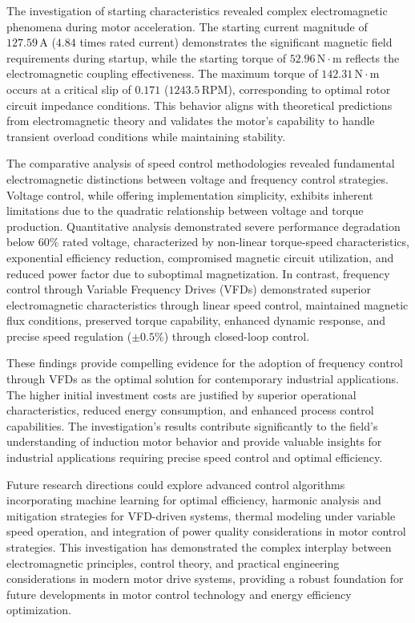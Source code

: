 \documentclass[a4paper,12pt]{IEEEtran}
\begin{document}
The investigation of starting characteristics revealed complex electromagnetic phenomena during motor acceleration. The starting current magnitude of $127.59\,\text{A}$ ($4.84$ times rated current) demonstrates the significant magnetic field requirements during startup, while the starting torque of $52.96\,\text{N}\cdot\text{m}$ reflects the electromagnetic coupling effectiveness. The maximum torque of $142.31\,\text{N}\cdot\text{m}$ occurs at a critical slip of $0.171$ ($1243.5\,\text{RPM}$), corresponding to optimal rotor circuit impedance conditions. This behavior aligns with theoretical predictions from electromagnetic theory and validates the motor's capability to handle transient overload conditions while maintaining stability.

The comparative analysis of speed control methodologies revealed fundamental electromagnetic distinctions between voltage and frequency control strategies. Voltage control, while offering implementation simplicity, exhibits inherent limitations due to the quadratic relationship between voltage and torque production. Quantitative analysis demonstrated severe performance degradation below $60\%$ rated voltage, characterized by non-linear torque-speed characteristics, exponential efficiency reduction, compromised magnetic circuit utilization, and reduced power factor due to suboptimal magnetization. In contrast, frequency control through Variable Frequency Drives (VFDs) demonstrated superior electromagnetic characteristics through linear speed control, maintained magnetic flux conditions, preserved torque capability, enhanced dynamic response, and precise speed regulation ($\pm0.5\%$) through closed-loop control.

These findings provide compelling evidence for the adoption of frequency control through VFDs as the optimal solution for contemporary industrial applications. The higher initial investment costs are justified by superior operational characteristics, reduced energy consumption, and enhanced process control capabilities. The investigation's results contribute significantly to the field's understanding of induction motor behavior and provide valuable insights for industrial applications requiring precise speed control and optimal efficiency.

Future research directions could explore advanced control algorithms incorporating machine learning for optimal efficiency, harmonic analysis and mitigation strategies for VFD-driven systems, thermal modeling under variable speed operation, and integration of power quality considerations in motor control strategies. This investigation has demonstrated the complex interplay between electromagnetic principles, control theory, and practical engineering considerations in modern motor drive systems, providing a robust foundation for future developments in motor control technology and energy efficiency optimization.
 




  

 
\end{document}
